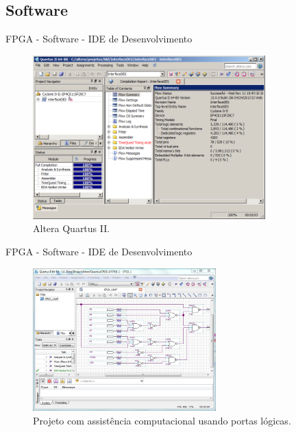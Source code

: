 \subsection{Software}
	\begin{frame}{FPGA - Software - IDE de Desenvolvimento}
        \vspace{-1em}
		\begin{figure}[p]
			\centering
			\includegraphics[width=0.8\textwidth]{img/fpga/altera.png}
			\caption{Altera Quartus II.}
			\label{fig:alteraquartus}
		\end{figure}
	\end{frame}

	\begin{frame}{FPGA - Software - IDE de Desenvolvimento}
        \vspace{-1em}
		\begin{figure}[p]
			\centering
			\includegraphics[width=0.63\textwidth]{img/fpga/software_quartus_portas.jpg}
			\caption{Projeto com assistência computacional usando portas lógicas.}
			\label{fig:alteraquartus_portas1}
		\end{figure}
	\end{frame}

